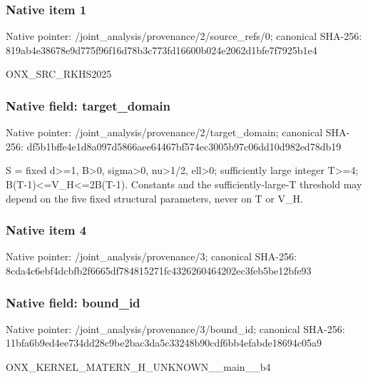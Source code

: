 \documentclass[10pt,a4paper]{article}
\begin{document}
\subsubsection{Native item 1}
Native pointer: /joint\_\allowbreak{}analysis/provenance/2/source\_\allowbreak{}refs/0; canonical SHA-256: 819ab4e38678e9d775f96f16d78b3c773fd16600b024e2062d1bfe7f7925b1e4

\begingroup\raggedright\sloppy ONX\_\allowbreak{}SRC\_\allowbreak{}RKHS2025\par\endgroup

\subsubsection{Native field: target\_\allowbreak{}domain}
Native pointer: /joint\_\allowbreak{}analysis/provenance/2/target\_\allowbreak{}domain; canonical SHA-256: df5b1bffe4e1d8a097d5866aee64467bf574ec3005b97c06dd10d982ed78db19

\begingroup\raggedright\sloppy S =\allowbreak{} fixed d>=\allowbreak{}1,\allowbreak{} B>0,\allowbreak{} sigma>0,\allowbreak{} nu>1/\allowbreak{}2,\allowbreak{} ell>0;\allowbreak{} sufficiently large integer T>=\allowbreak{}4;\allowbreak{} B(T-1)<=\allowbreak{}V\_\allowbreak{}H<=\allowbreak{}2B(T-1). Constants and the sufficiently-large-T threshold may depend on the five fixed structural parameters,\allowbreak{} never on T or V\_\allowbreak{}H.\par\endgroup

\subsubsection{Native item 4}
Native pointer: /joint\_\allowbreak{}analysis/provenance/3; canonical SHA-256: 8cda4c6ebf4dcbfb2f6665df784815271fc4326260464202ec3feb5be12bfe93

\subsubsection{Native field: bound\_\allowbreak{}id}
Native pointer: /joint\_\allowbreak{}analysis/provenance/3/bound\_\allowbreak{}id; canonical SHA-256: 11bfa6b9ed4ee734dd28c9be2bac3da5c33248b90cdf6bb4efabde18694c05a9

\begingroup\raggedright\sloppy ONX\_\allowbreak{}KERNEL\_\allowbreak{}MATERN\_\allowbreak{}H\_\allowbreak{}UNKNOWN\_\allowbreak{}\_\allowbreak{}main\_\allowbreak{}\_\allowbreak{}b4\par\endgroup
\end{document}
